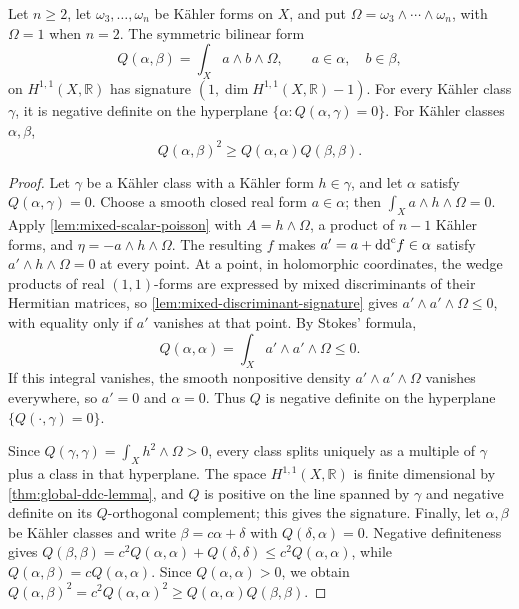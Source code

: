 \begin{theorem}\label{thm:mixed-hodge-index}
Let $n\geq2$, let $\omega_3,\ldots,\omega_n$ be K\"ahler forms on $X$, and put $\Omega=\omega_3\wedge\cdots\wedge\omega_n$, with $\Omega=1$ when $n=2$. The symmetric bilinear form
\[
 Q(\alpha,\beta)=\int_Xa\wedge b\wedge\Omega,
 \qquad a\in\alpha,\quad b\in\beta,
\]
on $H^{1,1}(X,\mathbb R)$ has signature $(1,\dim H^{1,1}(X,\mathbb R)-1)$. For every K\"ahler class $\gamma$, it is negative definite on the hyperplane $\{\alpha:Q(\alpha,\gamma)=0\}$. For K\"ahler classes $\alpha,\beta$,
\begin{equation}\label{eq:mixed-intersection-cauchy}
 Q(\alpha,\beta)^2\geq Q(\alpha,\alpha)Q(\beta,\beta).
\end{equation}
\end{theorem}
\begin{proof}
Let $\gamma$ be a K\"ahler class with a K\"ahler form $h\in\gamma$, and let $\alpha$ satisfy $Q(\alpha,\gamma)=0$. Choose a smooth closed real form $a\in\alpha$; then $\int_Xa\wedge h\wedge\Omega=0$. Apply \cref{lem:mixed-scalar-poisson} with $A=h\wedge\Omega$, a product of $n-1$ K\"ahler forms, and $\eta=-a\wedge h\wedge\Omega$. The resulting $f$ makes $a'=a+\mathrm{dd}^{\mathrm{c}} f\in\alpha$ satisfy $a'\wedge h\wedge\Omega=0$ at every point. At a point, in holomorphic coordinates, the wedge products of real $(1,1)$-forms are expressed by mixed discriminants of their Hermitian matrices, so \cref{lem:mixed-discriminant-signature} gives $a'\wedge a'\wedge\Omega\leq0$, with equality only if $a'$ vanishes at that point. By Stokes' formula,
\[
 Q(\alpha,\alpha)=\int_Xa'\wedge a'\wedge\Omega\leq0.
\]
If this integral vanishes, the smooth nonpositive density $a'\wedge a'\wedge\Omega$ vanishes everywhere, so $a'=0$ and $\alpha=0$. Thus $Q$ is negative definite on the hyperplane $\{Q(\cdot,\gamma)=0\}$.

Since $Q(\gamma,\gamma)=\int_Xh^2\wedge\Omega>0$, every class splits uniquely as a multiple of $\gamma$ plus a class in that hyperplane. The space $H^{1,1}(X,\mathbb R)$ is finite dimensional by \cref{thm:global-ddc-lemma}, and $Q$ is positive on the line spanned by $\gamma$ and negative definite on its $Q$-orthogonal complement; this gives the signature. Finally, let $\alpha,\beta$ be K\"ahler classes and write $\beta=c\alpha+\delta$ with $Q(\delta,\alpha)=0$. Negative definiteness gives $Q(\beta,\beta)=c^2Q(\alpha,\alpha)+Q(\delta,\delta)\leq c^2Q(\alpha,\alpha)$, while $Q(\alpha,\beta)=cQ(\alpha,\alpha)$. Since $Q(\alpha,\alpha)>0$, we obtain $Q(\alpha,\beta)^2=c^2Q(\alpha,\alpha)^2\geq Q(\alpha,\alpha)Q(\beta,\beta)$.
\end{proof}

